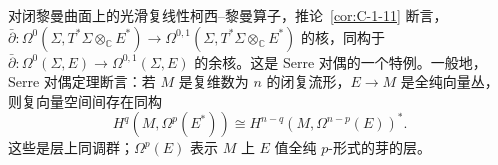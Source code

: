 \begin{remark}\label{rem:C-1-12}
对闭黎曼曲面上的光滑复线性柯西–黎曼算子，推论~\ref{cor:C-1-11} 断言，$\bar\partial:\Omega^0(\Sigma,T^*\Sigma\otimes_{\mathbb C}E^*)\to\Omega^{0,1}(\Sigma,T^*\Sigma\otimes_{\mathbb C}E^*)$ 的核，同构于 $\bar\partial:\Omega^0(\Sigma,E)\to\Omega^{0,1}(\Sigma,E)$ 的余核。这是 Serre 对偶的一个特例。一般地，Serre 对偶定理断言：若 $M$ 是复维数为 $n$ 的闭复流形，$E\to M$ 是全纯向量丛，则复向量空间间存在同构
\[
  H^q(M,\Omega^p(E^*))\cong H^{n-q}(M,\Omega^{n-p}(E))^*.
\]
这些是层上同调群；$\Omega^p(E)$ 表示 $M$ 上 $E$ 值全纯 $p$-形式的芽的层。
\end{remark}
